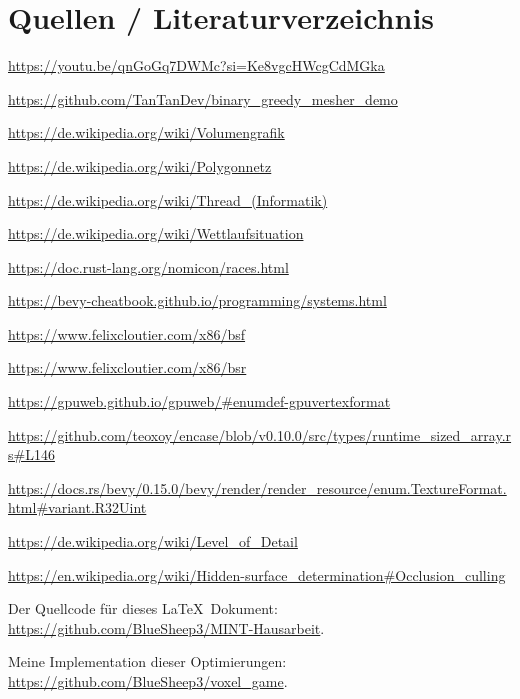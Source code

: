 \section{Quellen / Literaturverzeichnis}


\renewcommand{\section}[2]{}

\begin{thebibliography}{99}

\setlength{\itemindent}{0.25cm}

\url{https://youtu.be/qnGoGq7DWMc?si=Ke8vgcHWcgCdMGka}

\url{https://github.com/TanTanDev/binary_greedy_mesher_demo}

\url{https://de.wikipedia.org/wiki/Volumengrafik}

\url{https://de.wikipedia.org/wiki/Polygonnetz}

\url{https://de.wikipedia.org/wiki/Thread_(Informatik)}

\url{https://de.wikipedia.org/wiki/Wettlaufsituation}

\url{https://doc.rust-lang.org/nomicon/races.html}

\url{https://bevy-cheatbook.github.io/programming/systems.html}

\url{https://www.felixcloutier.com/x86/bsf}

\url{https://www.felixcloutier.com/x86/bsr}

\url{https://gpuweb.github.io/gpuweb/#enumdef-gpuvertexformat}

\url{https://github.com/teoxoy/encase/blob/v0.10.0/src/types/runtime_sized_array.rs#L146}

\url{https://docs.rs/bevy/0.15.0/bevy/render/render_resource/enum.TextureFormat.html#variant.R32Uint}

\url{https://de.wikipedia.org/wiki/Level_of_Detail}

\url{https://en.wikipedia.org/wiki/Hidden-surface_determination#Occlusion_culling}

\end{thebibliography}


\vspace{0.2cm}

\setlength{\parindent}{0pt}

Der Quellcode für dieses \LaTeX\ Dokument: \\
\url{https://github.com/BlueSheep3/MINT-Hausarbeit}.

\vspace{0.2cm}

Meine Implementation dieser Optimierungen: \\
\url{https://github.com/BlueSheep3/voxel_game}.
